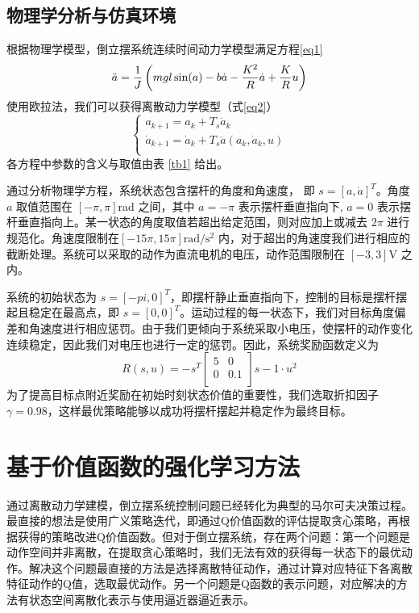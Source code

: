 \documentclass[conference,10pt]{IEEEtran}
\begin{document}
\subsection{物理学分析与仿真环境}
根据物理学模型，倒立摆系统连续时间动力学模型满足方程\ref{eq1}
\begin{equation}
\ddot{a} = \dfrac{1}{J}\large\left(mgl\sin(a)-b\dot{a}-\dfrac{K^2}{R}\dot{a}+\dfrac{K}{R}u\large\right)
\label{eq1}
\end{equation}
使用欧拉法，我们可以获得离散动力学模型（式\ref{eq2}）
\begin{equation}
	\left\{
	\begin{array}{l}
		a_{k+1}=a_k+T_s\dot{a}_k\\
		\dot{a}_{k+1}=\dot{a}_k+T_s\ddot{a}(a_k,\dot{a}_k, u)\\
	\end{array}\right.
\label{eq2}
\end{equation}
各方程中参数的含义与取值由表 \ref{tb1} 给出。

通过分析物理学方程，系统状态包含摆杆的角度和角速度， 即 $s=[a,\dot{a}]^T$。角度 $a$ 取值范围在 $[-\pi, \pi]$rad 之间，其中 $a=-\pi$ 表示摆杆垂直指向下, $a=0$ 表示摆杆垂直指向上。某一状态的角度取值若超出给定范围，则对应加上或减去 $2\pi$ 进行规范化。角速度限制在$[-15\pi,15\pi]\mathrm{rad/s^2}$ 内，对于超出的角速度我们进行相应的截断处理。系统可以采取的动作为直流电机的电压，动作范围限制在 $[-3, 3] \mathrm{V}$ 之内。

系统的初始状态为 $s=[-pi,0]^T$，即摆杆静止垂直指向下，控制的目标是摆杆摆起且稳定在最高点，即 $s=[0,0]^T$。运动过程的每一状态下，我们对目标角度偏差和角速度进行相应惩罚。由于我们更倾向于系统采取小电压，使摆杆的动作变化连续稳定，因此我们对电压也进行一定的惩罚。因此，系统奖励函数定义为
\begin{equation}
	R(s,u) = -s^T\begin{bmatrix}
		5&0\\
		0&0.1\\
	\end{bmatrix}s-1\cdot u^2
\end{equation}
为了提高目标点附近奖励在初始时刻状态价值的重要性，我们选取折扣因子 $\gamma = 0.98$，这样最优策略能够以成功将摆杆摆起并稳定作为最终目标。

\section{基于价值函数的强化学习方法}
通过离散动力学建模，倒立摆系统控制问题已经转化为典型的马尔可夫决策过程。最直接的想法是使用广义策略迭代，即通过Q价值函数的评估提取贪心策略，再根据获得的策略改进Q价值函数。但对于倒立摆系统，存在两个问题：第一个问题是动作空间并非离散，在提取贪心策略时，我们无法有效的获得每一状态下的最优动作。解决这个问题最直接的方法是选择离散特征动作，通过计算对应特征下各离散特征动作的Q值，选取最优动作。另一个问题是Q函数的表示问题，对应解决的方法有状态空间离散化表示与使用逼近器逼近表示。
\end{document}
